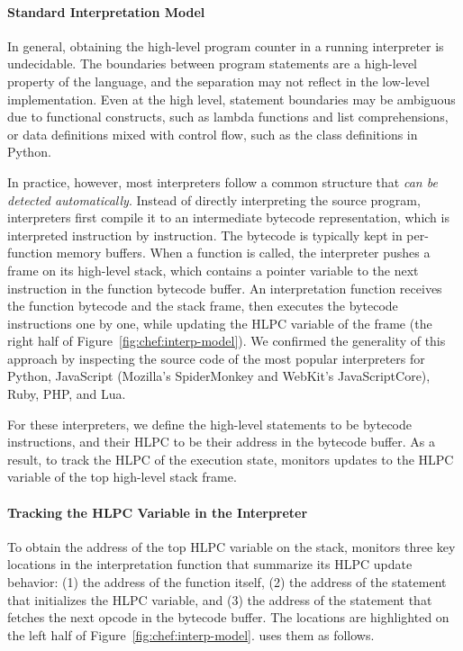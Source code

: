 \paragraph{Standard Interpretation Model}

In general, obtaining the high-level program counter in a running interpreter is undecidable.
%
The boundaries between program statements are a high-level property of the language, and the separation may not reflect in the low-level implementation.  Even at the high level, statement boundaries may be ambiguous due to functional constructs, such as lambda functions and list comprehensions, or data definitions mixed with control flow, such as the class definitions in Python.

In practice, however, most interpreters follow a common structure that \emph{can be detected automatically}.
%
Instead of directly interpreting the source program, interpreters first compile it to an intermediate bytecode representation, which is interpreted instruction by instruction.  The bytecode is typically kept in per-function memory buffers.
%
When a function is called, the interpreter pushes a frame on its high-level stack, which contains a pointer variable to the next instruction in the function bytecode buffer.
%
An interpretation function receives the function bytecode and the stack frame, then executes the bytecode instructions one by one, while updating the HLPC variable of the frame (the right half of Figure~\ref{fig:chef:interp-model}).
%
We confirmed the generality of this approach by inspecting the source code of the most popular interpreters for Python, JavaScript (Mozilla's SpiderMonkey and WebKit's JavaScriptCore), Ruby, PHP, and Lua.

For these interpreters, we define the \chef high-level statements to be bytecode instructions, and their HLPC to be their address in the bytecode buffer.
%
As a result, to track the HLPC of the execution state, \chef monitors updates to the HLPC variable of the top high-level stack frame.

\paragraph{Tracking the HLPC Variable in the Interpreter}

To obtain the address of the top HLPC variable on the stack, \chef monitors three key locations in the interpretation function that summarize its HLPC update behavior:
%
(1) the address of the function itself, (2) the address of the statement that initializes the HLPC variable, and (3) the address of the statement that fetches the next opcode in the bytecode buffer.  The locations are highlighted on the left half of Figure~\ref{fig:chef:interp-model}.
%
\chef uses them as follows.

